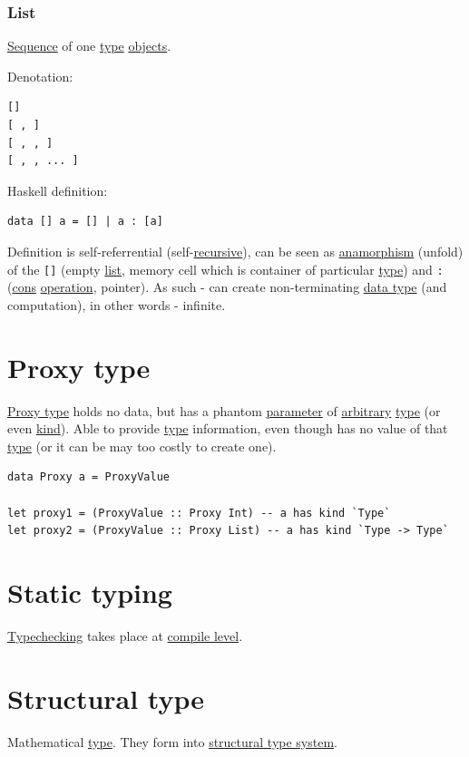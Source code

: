 \documentclass[a4paper,14pt,oneside]{book}
\begin{document}
\subsubsection{\label{orgab36b30}List}
\label{sec:orgf3b4ad2}
\hyperref[orgcaf3223]{Sequence} of one \hyperref[org1eff537]{type} \hyperref[orgde02dc0]{objects}.

Denotation:
\begin{verbatim}
[]
[ , ]
[ , , ]
[ , , ... ]
\end{verbatim}

Haskell definition:
\begin{verbatim}
data [] a = [] | a : [a]
\end{verbatim}

Definition is self-referrential (self-\hyperref[org361c254]{recursive}), can be seen as \hyperref[org227806e]{anamorphism} (unfold) of the \texttt{[]} (empty \hyperref[orgab36b30]{list}, memory cell which is container of particular \hyperref[org1eff537]{type}) and \texttt{:} (\hyperref[orgf2d700a]{cons} \hyperref[orgf147542]{operation}, pointer). As such - can create non-terminating \hyperref[org194580e]{data type} (and computation), in other words - infinite.

\section{\label{orge0964b1}Proxy type}
\label{sec:org0f723b9}
\hyperref[orge0964b1]{Proxy type} holds no data, but has a phantom \hyperref[orgae9d304]{parameter} of \hyperref[org326f4d0]{arbitrary} \hyperref[org1eff537]{type} (or even \hyperref[org7822bc9]{kind}). Able to provide \hyperref[org1eff537]{type} information, even though has no value of that \hyperref[org1eff537]{type} (or it can be may too costly to create one).
\begin{verbatim}
data Proxy a = ProxyValue

let proxy1 = (ProxyValue :: Proxy Int) -- a has kind `Type`
let proxy2 = (ProxyValue :: Proxy List) -- a has kind `Type -> Type`
\end{verbatim}

\section{\label{orgb2d2107}Static typing}
\label{sec:org05d8b28}
\hyperref[org3aaaa4d]{Typechecking} takes place at \hyperref[org4093a9b]{compile level}.

\section{\label{org55b829e}Structural type}
\label{sec:orgd4b7763}
Mathematical \hyperref[org1eff537]{type}. They form into \hyperref[org6e47b94]{structural type system}.
\end{document}
